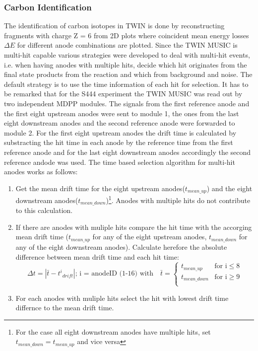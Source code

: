 \subsubsection{Carbon Identification}\label{subsec:carbon_id}
The identification of carbon isotopes in TWIN is done by reconstructing fragments with charge Z = 6 from 2D plots where coincident mean energy losses $\Delta E$ for different anode combinations are plotted. Since the TWIN MUSIC is multi-hit capable various strategies were developed to deal with multi-hit events, i.e. when having anodes with multiple hits, decide which hit originates from the final state products from the reaction and which from background and noise.\newline
The default strategy is to use the time information of each hit for selection. It has to be remarked that for the S444 experiment the TWIN MUSIC was read out by two independent MDPP modules\cite{MDPP-16}. The signals from the first reference anode and the first eight upstream anodes were sent to module 1, the ones from the last eight downstream anodes and the second reference anode were forwarded to module 2. For the first eight upstream anodes the drift time is calculated by substracting the hit time in each anode by the reference time from the first reference anode and for the last eight downstream anodes accordingly the second reference andode was used.\newline
The time based selection algorithm for multi-hit anodes works as follows:\newline
\begin{enumerate}
\itemsep0em
\item Get the mean drift time for the eight upstream anodes($t_{mean\_up}$) and the eight downstream anodes($t_{mean\_down}$)\footnote{For the case all eight downstream anodes have multiple hits, set $t_{mean\_down} = t_{mean\_up}$ and vice versa}. Anodes with multiple hits do not contribute to this calculation.
\item If there are anodes with muliple hits compare the hit time with the accorging mean drift time ($t_{mean\_up}$ for any of the eight upstream anodes, $t_{mean\_down}$ for any of the eight downstream anodes). Calculate herefore the absolute difference between mean drift time and each hit time:
\begin{equation}
\Delta t = | \bar{t} - {t^i}_{drift}|; \, \text{i = anodeID (1-16) with} \quad \bar{t} = 
\begin{cases}
t_{mean\_up} & \text{for i} \leq 8\\
t_{mean\_down} & \text{for i} \geq 9 \\
\end{cases}
\end{equation}
\item For each anodes with muliple hits select the hit with lowest drift time differnce to the mean drift time.
\end{enumerate}

